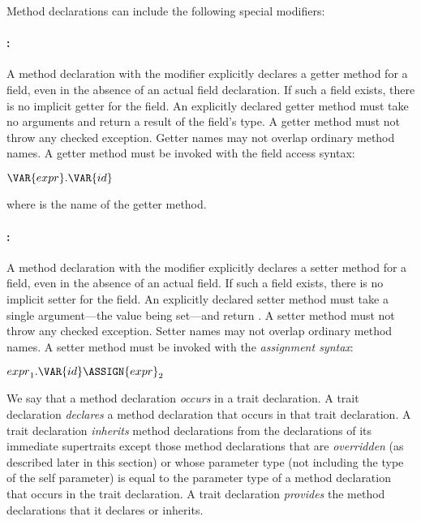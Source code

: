 Method declarations can include the following special modifiers:
\paragraph{:}
A method declaration with the modifier  explicitly declares a
getter method for a field, even in the absence of an actual field declaration.
If such a field exists, there is no implicit getter for the field.
An explicitly declared getter method must take no arguments and return a
result of the field's type.
A getter method must not throw any checked exception.
Getter names may not overlap ordinary method names.
A getter method must be invoked with the field access syntax:
\begin{Fortress}
\(\VAR{expr}.\VAR{id}\)
\end{Fortress}
where  is the name of the getter method.



\paragraph{:}
A method declaration with the modifier  explicitly declares a
setter method for a field, even in the absence of an actual field.
If such a field exists, there is no implicit setter for the field.
An explicitly declared setter method must take a single argument---the
value being set---and return \EXP{()}.
A setter method must not throw any checked exception.
Setter names may not overlap ordinary method names.
A setter method must be invoked with the \emph{assignment syntax}:
\begin{Fortress}
\({expr}_{1}.\VAR{id} \ASSIGN {expr}_{2}\)
\end{Fortress}


We say that a method declaration \emph{occurs} in a trait declaration.
A trait declaration \emph{declares} a method declaration that occurs
in that trait declaration.
A trait declaration \emph{inherits} method declarations from the
declarations of its immediate supertraits
except those method declarations
that are \emph{overridden} (as described later in this section) or
whose parameter type (not including the type of the self parameter)
is equal to the parameter type of a method declaration
that occurs in the trait declaration.
A trait declaration \emph{provides} the method declarations that it
declares or inherits.




